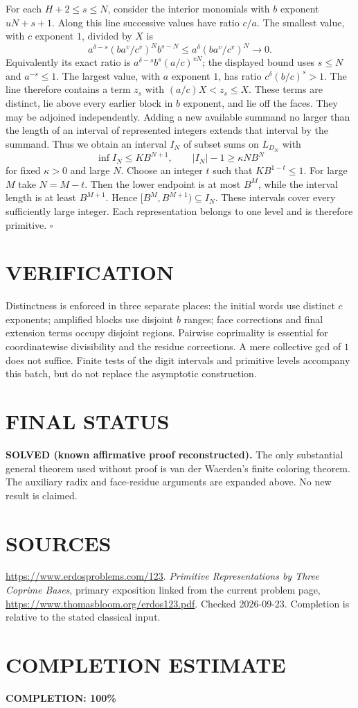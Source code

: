 For each $H+2\le s\le N$, consider the interior monomials with $b$
exponent $uN+s+1$. Along this line successive values have ratio $c/a$.
The smallest value, with $c$ exponent $1$, divided by $X$ is
\[
 a^{\delta-s}(ba^v/c^v)^N b^{s-N}\le
 a^\delta(ba^v/c^v)^N\longrightarrow0.
\]
Equivalently its exact ratio is $a^{\delta-s}b^s(a/c)^{vN}$;
the displayed bound uses $s\le N$ and $a^{-s}\le1$.
The largest value, with $a$ exponent $1$, has ratio
$c^\delta(b/c)^s>1$. The line therefore contains a term $z_s$ with
$(a/c)X<z_s\le X$. These terms are distinct, lie above every earlier
block in $b$ exponent, and lie off the faces. They may be adjoined
independently. Adding a new available summand no larger than the length
of an interval of represented integers extends that interval by the
summand. Thus we obtain an interval $I_N$ of subset sums on $L_{D_N}$
with
\[
 \inf I_N\le KB^{N+1},\qquad
 |I_N|-1\ge\kappa N B^N
\]
for fixed $\kappa>0$ and large $N$.
Choose an integer $t$ such that $KB^{1-t}\le1$. For large $M$ take
$N=M-t$. Then the lower endpoint is at most $B^M$, while the interval
length is at least $B^{M+1}$. Hence $[B^M,B^{M+1})\subseteq I_N$.
These intervals cover every sufficiently large integer. Each
representation belongs to one level and is therefore primitive.
\hfill$\square$

\section{VERIFICATION}
Distinctness is enforced in three separate places: the initial words
use distinct $c$ exponents; amplified blocks use disjoint $b$ ranges;
face corrections and final extension terms occupy disjoint regions.
Pairwise coprimality is essential for coordinatewise divisibility and
the residue corrections. A mere collective gcd of $1$ does not suffice.
Finite tests of the digit intervals and primitive levels accompany
this batch, but do not replace the asymptotic construction.

\section{FINAL STATUS}
\textbf{SOLVED (known affirmative proof reconstructed).}
The only substantial general theorem used without proof is van der
Waerden's finite coloring theorem. The auxiliary radix and face-residue
arguments are expanded above. No new result is claimed.

\section{SOURCES}
\url{https://www.erdosproblems.com/123}.
\emph{Primitive Representations by Three Coprime Bases}, primary
exposition linked from the current problem page,
\url{https://www.thomasbloom.org/erdos123.pdf}.
Checked 2026-09-23. Completion is relative to the stated classical input.

\section{COMPLETION ESTIMATE}
\textbf{COMPLETION: 100\%}
